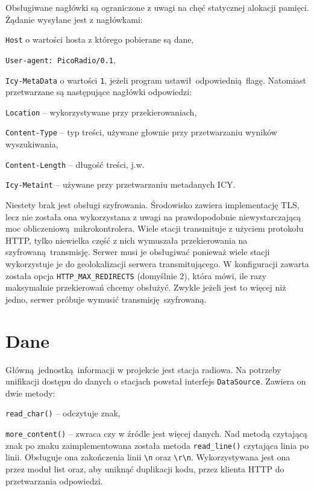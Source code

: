\documentclass[12pt]{report}
\let\tempone\itemize
\let\temptwo\enditemize
\renewenvironment{itemize}{\tempone\setlength{\itemsep}{0cm}}{\temptwo}
\begin{document}
		Obsługiwane nagłówki są ograniczone z uwagi na chęć statycznej alokacji pamięci. Żądanie wysyłane jest z nagłówkami:
		\begin{itemize}
			\item \lstinline|Host| o wartości hosta z którego pobierane są dane,
			\item \lstinline|User-agent: PicoRadio/0.1|,
			\item \lstinline|Icy-MetaData| o wartości \lstinline|1|, jeżeli program ustawił odpowiednią flagę.
		\end{itemize}
		Natomiast przetwarzane są następujące nagłówki odpowiedzi:
		\begin{itemize}
			\item \lstinline|Location| -- wykorzystywane przy przekierowaniach,
			\item \lstinline|Content-Type| -- typ treści, używane głownie przy przetwarzaniu wyników wyszukiwania,
			\item \lstinline|Content-Length| -- długość treści, j.w.
			\item \lstinline|Icy-Metaint| -- używane przy przetwarzaniu metadanych ICY.
		\end{itemize}
		
		Niestety brak jest obsługi szyfrowania. Środowisko zawiera implementację TLS, lecz nie została ona wykorzystana z uwagi na prawdopodobnie niewystarczającą moc obliczeniową mikrokontrolera. Wiele stacji transmituje z użyciem protokołu HTTP, tylko niewielka część z nich wymuszała przekierowania na szyfrowaną transmisję. Serwer musi je obsługiwać ponieważ wiele stacji wykorzystuje je do geolokalizacji serwera transmitującego. W konfiguracji zawarta została opcja \lstinline|HTTP_MAX_REDIRECTS| (domyślnie 2), która mówi, ile razy maksymalnie przekierowań chcemy obsłużyć. Zwykle jeżeli jest to więcej niż jedno, serwer próbuje wymusić transmisję szyfrowaną.
		
	\section{Dane}
		Główną jednostką informacji w projekcie jest stacja radiowa. Na potrzeby unifikacji dostępu do danych o stacjach powstał interfejs \lstinline|DataSource|. Zawiera on dwie metody:
		\begin{itemize}
			\item \lstinline|read_char()| -- odczytuje znak,
			\item \lstinline|more_content()| -- zwraca czy w źródle jest więcej danych.
		\end{itemize}
		Nad metodą czytającą znak po znaku zaimplementowana została metoda \lstinline|read_line()| czytająca linia po linii. Obsługuje ona zakończenia linii \lstinline|\n| oraz \lstinline|\r\n|. Wykorzystywana jest ona przez moduł list oraz, aby uniknąć duplikacji kodu, przez klienta HTTP do przetwarzania odpowiedzi.
		
\end{document}
